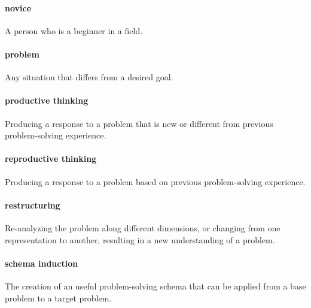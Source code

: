 \documentclass[
]{krantz}
\begin{document}
\paragraph*{novice}\label{novice}

A person who is a beginner in a field.

\paragraph*{problem}\label{problem}

Any situation that differs from a desired goal.

\paragraph*{productive thinking}\label{productive-thinking}

Producing a response to a problem that is new or different from previous problem-solving experience.

\paragraph*{reproductive thinking}\label{reproductive-thinking}

Producing a response to a problem based on previous problem-solving experience.

\paragraph*{restructuring}\label{restructuring}

Re-analyzing the problem along different dimensions, or changing from one representation to another, resulting in a new understanding of a problem.

\paragraph*{schema induction}\label{schema-induction}

The creation of an useful problem-solving schema that can be applied from a base problem to a target problem.
\end{document}
